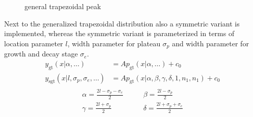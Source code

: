 \begin{figure}[htb]
\captionsetup[subfigure]{position=b}
\centering
{}
\hfill
{}
\caption{general trapezoidal peak}
\end{figure}

Next to the generalized trapezoidal distribution also a symmetric variant is implemented, whereas the symmetric variant is parameterized in terms of location parameter $l$, width parameter for plateau $\sigma_p$ and width parameter for growth and decay stage $\sigma_e$.
\begin{align}\label{eq:generalizedtrapezoidalpeakArea}
y_\mathrm{gt}(x|\alpha,\ldots) &= A\textstyle p_\mathrm{gt}(x|\alpha,\ldots) +c_0 \\
y_\mathrm{sgt}(x|l,\sigma_p,\sigma_e,\ldots) &= A \textstyle p_\mathrm{gt}\left(x|\alpha,\beta,\gamma,\delta,1,n_1,n_1\right) +c_0 \end{align}
\begin{align}
\begin{array}{ll}
\displaystyle\alpha = \frac{2l-\sigma_p-\sigma_e}{2} & \displaystyle\qquad \beta  = \frac{2l-\sigma_p}{2} \\
\displaystyle\gamma = \frac{2l+\sigma_p}{2}          & \displaystyle\qquad \delta = \frac{2l+\sigma_p+\sigma_e}{2}
\end{array}
\end{align}

